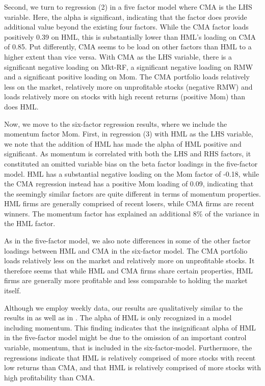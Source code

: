 Second, we turn to regression (2) in a five factor model where CMA is the LHS variable. Here, the alpha is significant, indicating that the factor does provide additional value beyond the existing four factors. While the CMA factor loads positively 0.39 on HML, this is substantially lower than HML's loading on CMA of 0.85. Put differently, CMA seems to be load on other factors than HML to a higher extent than vice versa. With CMA as the LHS variable, there is a significant negative loading on Mkt-RF, a significant negative loading on RMW and a significant positive loading on Mom. The CMA portfolio loads relatively less on the market, relatively more on unprofitable stocks (negative RMW) and loads relatively more on stocks with high recent returns (positive Mom) than does HML.

Now, we move to the six-factor regression results, where we include the momentum factor Mom. First, in regression (3) with HML as the LHS variable, we note that the addition of HML has made the alpha of HML positive and significant. As momentum is correlated with both the LHS and RHS factors, it constituted an omitted variable bias on the beta factor loadings in the five-factor model. HML has a substantial negative loading on the Mom factor of -0.18, while the CMA regression instead has a positive Mom loading of 0.09, indicating that the seemingly similar factors are quite different in terms of momentum properties. HML firms are generally comprised of recent losers, while CMA firms are recent winners. The momentum factor has explained an additional 8\% of the variance in the HML factor.

As in the five-factor model, we also note differences in some of the other factor loadings between HML and CMA in the six-factor model. The CMA portfolio loads relatively less on the market and relatively more on unprofitable stocks. It therefore seems that while HML and CMA firms share certain properties, HML firms are generally more profitable and less comparable to holding the market itself.

Although we employ weekly data, our results are qualitatively similar to the results in \textcite{FF2015} as well as in \textcite{Asness2015}. The alpha of HML is only recognized in a model including momentum. This finding indicates that the insignificant alpha of HML in the five-factor model might be due to the omission of an important control variable, momentum, that is included in the six-factor-model. Furthermore, the regressions indicate that HML is relatively comprised of more stocks with recent low returns than CMA, and that HML is relatively comprised of more stocks with high profitability than CMA.

